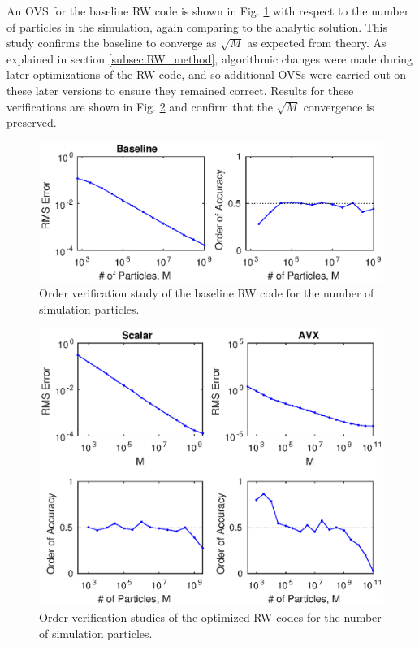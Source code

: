 \documentclass[letterpaper]{article}
\begin{document}
An OVS for the baseline RW code is shown in Fig. \ref{fig:OVS_RW_1} with respect to the number of particles in the simulation, again comparing to the analytic solution. This study confirms the baseline to converge as $\sqrt{M}$ as expected from theory. As explained in section \ref{subsec:RW_method}, algorithmic changes were made during later optimizations of the RW code, and so additional OVSs were carried out on these later versions to ensure they remained correct. Results for these verifications are shown in Fig. \ref{fig:OVS_RW_2} and confirm that the $\sqrt{M}$ convergence is preserved.

\begin{figure}\centering
  \includegraphics[width=\linewidth]{./plots/OVS_RW_1.eps}
  \caption{Order verification study of the baseline RW code for the number of simulation particles.}
  \label{fig:OVS_RW_1}
\end{figure}

\begin{figure}\centering
  \includegraphics[width=\linewidth]{./plots/OVS_RW_2.eps}
  \caption{Order verification studies of the optimized RW codes for the number of simulation particles.}
  \label{fig:OVS_RW_2}
\end{figure}
\end{document}
